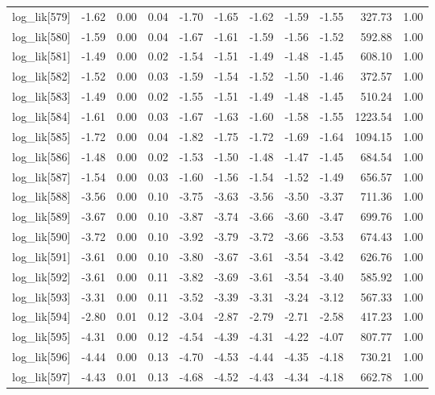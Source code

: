 \begin{table}[ht]
\begin{tabular}{rrrrrrrrrrr}
  log\_lik[579] & -1.62 & 0.00 & 0.04 & -1.70 & -1.65 & -1.62 & -1.59 & -1.55 & 327.73 & 1.00 \\ 
  log\_lik[580] & -1.59 & 0.00 & 0.04 & -1.67 & -1.61 & -1.59 & -1.56 & -1.52 & 592.88 & 1.00 \\ 
  log\_lik[581] & -1.49 & 0.00 & 0.02 & -1.54 & -1.51 & -1.49 & -1.48 & -1.45 & 608.10 & 1.00 \\ 
  log\_lik[582] & -1.52 & 0.00 & 0.03 & -1.59 & -1.54 & -1.52 & -1.50 & -1.46 & 372.57 & 1.00 \\ 
  log\_lik[583] & -1.49 & 0.00 & 0.02 & -1.55 & -1.51 & -1.49 & -1.48 & -1.45 & 510.24 & 1.00 \\ 
  log\_lik[584] & -1.61 & 0.00 & 0.03 & -1.67 & -1.63 & -1.60 & -1.58 & -1.55 & 1223.54 & 1.00 \\ 
  log\_lik[585] & -1.72 & 0.00 & 0.04 & -1.82 & -1.75 & -1.72 & -1.69 & -1.64 & 1094.15 & 1.00 \\ 
  log\_lik[586] & -1.48 & 0.00 & 0.02 & -1.53 & -1.50 & -1.48 & -1.47 & -1.45 & 684.54 & 1.00 \\ 
  log\_lik[587] & -1.54 & 0.00 & 0.03 & -1.60 & -1.56 & -1.54 & -1.52 & -1.49 & 656.57 & 1.00 \\ 
  log\_lik[588] & -3.56 & 0.00 & 0.10 & -3.75 & -3.63 & -3.56 & -3.50 & -3.37 & 711.36 & 1.00 \\ 
  log\_lik[589] & -3.67 & 0.00 & 0.10 & -3.87 & -3.74 & -3.66 & -3.60 & -3.47 & 699.76 & 1.00 \\ 
  log\_lik[590] & -3.72 & 0.00 & 0.10 & -3.92 & -3.79 & -3.72 & -3.66 & -3.53 & 674.43 & 1.00 \\ 
  log\_lik[591] & -3.61 & 0.00 & 0.10 & -3.80 & -3.67 & -3.61 & -3.54 & -3.42 & 626.76 & 1.00 \\ 
  log\_lik[592] & -3.61 & 0.00 & 0.11 & -3.82 & -3.69 & -3.61 & -3.54 & -3.40 & 585.92 & 1.00 \\ 
  log\_lik[593] & -3.31 & 0.00 & 0.11 & -3.52 & -3.39 & -3.31 & -3.24 & -3.12 & 567.33 & 1.00 \\ 
  log\_lik[594] & -2.80 & 0.01 & 0.12 & -3.04 & -2.87 & -2.79 & -2.71 & -2.58 & 417.23 & 1.00 \\ 
  log\_lik[595] & -4.31 & 0.00 & 0.12 & -4.54 & -4.39 & -4.31 & -4.22 & -4.07 & 807.77 & 1.00 \\ 
  log\_lik[596] & -4.44 & 0.00 & 0.13 & -4.70 & -4.53 & -4.44 & -4.35 & -4.18 & 730.21 & 1.00 \\ 
  log\_lik[597] & -4.43 & 0.01 & 0.13 & -4.68 & -4.52 & -4.43 & -4.34 & -4.18 & 662.78 & 1.00 \\ 

\end{tabular}
\end{table}
